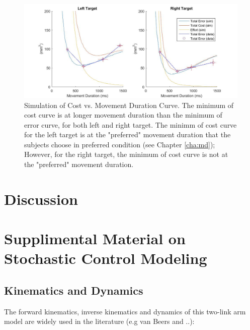 \begin{figure}
	\centering
	\includegraphics[width=\linewidth]{"figures/variability - cost - minimum shift"}
	\caption[Simulation of Cost vs. Movement Duration Curve]{Simulation of Cost vs. Movement Duration Curve. The minimum of cost curve is at longer movement duration than the minimum of error curve, for both left and right target. The minimm of cost curve for the left target is at the "preferred" movement duration that the subjects choose in preferred condition (see Chapter \ref{cha:md}); However, for the right target, the minimum of cost curve is not at the "preferred" movement duration.}
	\label{fig:variability---cost---minimum-shift}
\end{figure}


\section{Discussion}

\section{Supplimental Material on Stochastic Control Modeling}
\label{app:oc}

\subsection{Kinematics and Dynamics}
\label{app:kindyn}
The forward kinematics, inverse kinematics and dynamics of this two-link arm model are widely used in the literature (e.g van Beers and ..):

